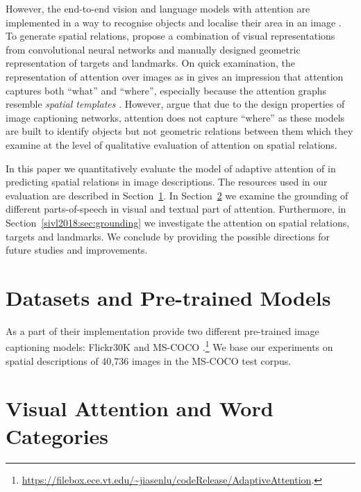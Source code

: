 However, the end-to-end vision and language models with attention are
implemented in a way to recognise objects and localise their area in an image
\cite{ba2014multiple,mnih2014recurrent}. To generate spatial relations,
\cite{ramisa2015combining} propose a combination of visual representations from
convolutional neural networks and manually designed geometric representation of
targets and landmarks. On quick examination, the representation of attention
over images as in \cite{xu2015show} gives an impression that attention captures
both ``what'' and ``where'', especially because the attention graphs resemble
\emph{spatial templates} \cite{logan1996computational}. However,
\cite{kelleher2017not} argue that due to the design properties of image
captioning networks, attention does not capture ``where'' as these models are
built to identify objects but not geometric relations between them which
they examine at the level of qualitative evaluation of
attention on spatial relations.

In this paper we quantitatively evaluate the model of adaptive attention of
\cite{lu2017knowing} in predicting spatial relations in image descriptions.
The resources used in our evaluation are described in
Section~\ref{sivl2018:sec:resources}. In Section~\ref{sivl2018:sec:detection} we examine the
grounding of different parts-of-speech in visual and textual part of attention.
Furthermore, in Section~\ref{sivl2018:sec:grounding} we investigate the attention on
spatial relations, targets and landmarks. We conclude by providing the possible
directions for future studies and improvements.

\section{Datasets and Pre-trained Models}\label{sivl2018:sec:resources}

As a part of their implementation \cite{lu2017knowing} provide two different
pre-trained image captioning models: Flickr30K \cite{young2014image} and
MS-COCO \cite{lin2014microsoft}.\footnote{ \url{https://filebox.ece.vt.edu/~jiasenlu/codeRelease/AdaptiveAttention}.}
We base our experiments on spatial descriptions of 40,736 images in the MS-COCO test corpus.

\section{Visual Attention and Word Categories}\label{sivl2018:sec:detection}

